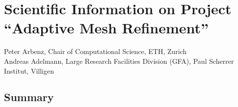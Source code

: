 \documentclass[11pt,a4paper]{article}
\begin{document}
\setcounter{section}{1}
\section{Scientific Information on Project \\
  ``Adaptive Mesh Refinement''%
}

\begin{center}
  Peter Arbenz, Chair of Computational Science, ETH, Zurich \\
  Andreas Adelmann, Large Research Facilities Division (GFA), Paul Scherrer
  Institut, Villigen
\end{center}

{\small
  \subsection{Summary}
  
}
\end{document}
